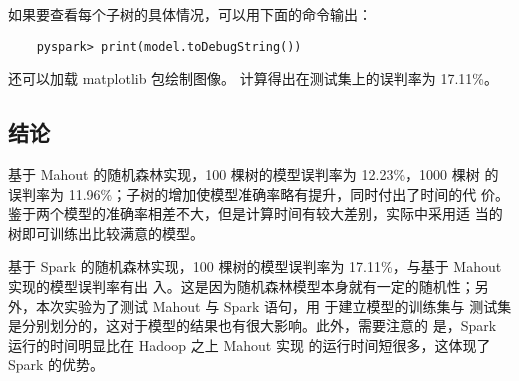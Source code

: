如果要查看每个子树的具体情况，可以用下面的命令输出：

\begin{lstlisting}
	pyspark> print(model.toDebugString())
\end{lstlisting}

还可以加载 matplotlib 包绘制图像。 计算得出在测试集上的误判率为
17.11\%。

\subsection{结论}\label{ux7ed3ux8bba}

基于 Mahout 的随机森林实现，100 棵树的模型误判率为 12.23\%，1000 棵树
的误判率为 11.96\%；子树的增加使模型准确率略有提升，同时付出了时间的代
价。鉴于两个模型的准确率相差不大，但是计算时间有较大差别，实际中采用适
当的树即可训练出比较满意的模型。

基于 Spark 的随机森林实现，100 棵树的模型误判率为 17.11\%，与基于 Mahout
实现的模型误判率有出
入。这是因为随机森林模型本身就有一定的随机性；另外，本次实验为了测试
Mahout 与 Spark 语句，用 于建立模型的训练集与
测试集是分别划分的，这对于模型的结果也有很大影响。此外，需要注意的
是，Spark 运行的时间明显比在 Hadoop 之上 Mahout 实现
的运行时间短很多，这体现了 Spark 的优势。


